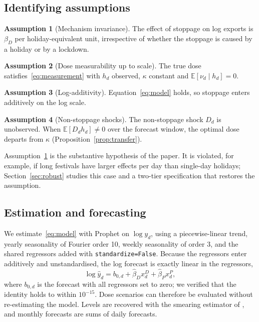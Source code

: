 \documentclass{article}
\theoremstyle{plain}
\theoremstyle{definition}
\newtheorem{assumption}{Assumption}
\theoremstyle{remark}
\newcommand{\E}{\mathbb{E}}
\begin{document}
\subsection{Identifying assumptions}
\begin{assumption}[Mechanism invariance]\label{ass:inv}
The effect of stoppage on log exports is $\beta_D$ per holiday-equivalent unit, irrespective of whether the stoppage is caused by a holiday or by a lockdown.
\end{assumption}
\begin{assumption}[Dose measurability up to scale]\label{ass:dose}
The true dose satisfies~\eqref{eq:measurement} with $h_d$ observed, $\kappa$ constant and $\E[\nu_d\mid h_d]=0$.
\end{assumption}
\begin{assumption}[Log-additivity]\label{ass:add}
Equation~\eqref{eq:model} holds, so stoppage enters additively on the log scale.
\end{assumption}
\begin{assumption}[Non-stoppage shocks]\label{ass:demand}
The non-stoppage shock $D_d$ is unobserved. When $\E[D_d h_d]\neq 0$ over the forecast window, the optimal dose departs from $\kappa$ (Proposition~\ref{prop:transfer}).
\end{assumption}
Assumption~\ref{ass:inv} is the substantive hypothesis of the paper. It is violated, for example, if long festivals have larger effects per day than single-day holidays; Section~\ref{sec:robust} studies this case and a two-tier specification that restores the assumption.

\subsection{Estimation and forecasting}
We estimate~\eqref{eq:model} with Prophet on $\log y_d$, using a piecewise-linear trend, yearly seasonality of Fourier order 10, weekly seasonality of order 3, and the shared regressors added with \texttt{standardize=False}. Because the regressors enter additively and unstandardised, the log forecast is exactly linear in the regressors,
\begin{equation}\label{eq:linear}
\log\hat y_d = b_{0,d} + \hat\beta_D x^D_d + \hat\beta_P x^P_d ,
\end{equation}
where $b_{0,d}$ is the forecast with all regressors set to zero; we verified that the identity holds to within $10^{-15}$. Dose scenarios can therefore be evaluated without re-estimating the model. Levels are recovered with the smearing estimator of \citet{duan1983smearing}, and monthly forecasts are sums of daily forecasts.
\end{document}
